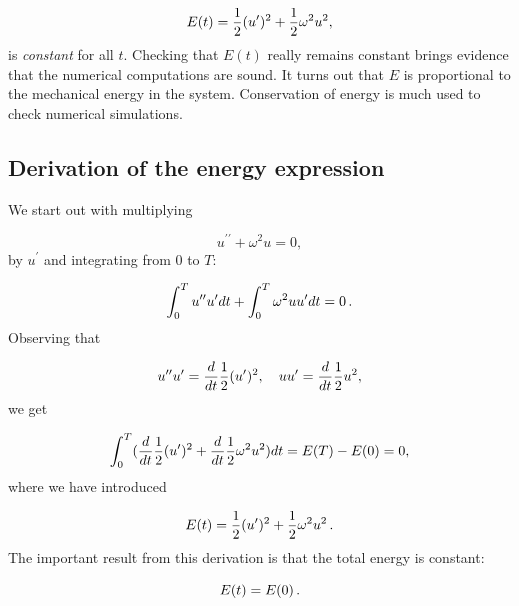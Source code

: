 \documentclass[%
oneside,                 %
final,                   %
10pt]{article}
\begin{document}
\[ E(t) = \half(u^{\prime})^2 + \half\omega^2u^2,\]
is \emph{constant} for all $t$. Checking that $E(t)$ really remains constant
brings evidence that the numerical computations are sound.
It turns out that $E$ is proportional to the mechanical energy
in the system. Conservation of energy is
much used to check numerical simulations.

\subsection{Derivation of the energy expression}

We start out with multiplying

\[ u^{\prime\prime} + \omega^2 u = 0,\]
by $u^{\prime}$ and integrating from $0$ to $T$:

\[ \int_0^T u^{\prime\prime}u^{\prime} dt + \int_0^T\omega^2 u u^{\prime} dt = 0\tp\]
Observing that

\[ u^{\prime\prime}u^{\prime} = \frac{d}{dt}\half(u^{\prime})^2,\quad uu^{\prime} = \frac{d}{dt} {\half}u^2,\]
we get

\[
\int_0^T (\frac{d}{dt}\half(u^{\prime})^2 + \frac{d}{dt} \half\omega^2u^2)dt = E(T) - E(0)=0,
\]
where we have introduced

\begin{equation}
E(t) = \half(u^{\prime})^2 + \half\omega^2u^2\tp
\label{vib:model1:energy:balance1}
\end{equation}
The important result from this derivation is that the total energy
is constant:

\[ E(t) = E(0)\tp\]
\end{document}
